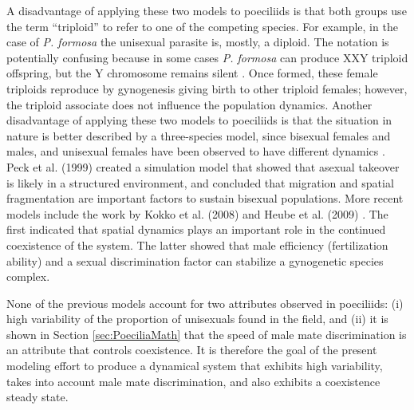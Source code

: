 	A disadvantage of applying these two models to poeciliids is that both groups use the term ``triploid'' to refer to one of the competing species. For example, in the case of \textit{P. formosa} the unisexual parasite is, mostly, a diploid. The notation is potentially confusing because in some cases \textit{P. formosa} can produce XXY triploid offspring, but the Y chromosome remains silent \cite{Balsano:Poecilia}. Once formed, these female triploids reproduce by gynogenesis giving birth to other triploid females; however, the triploid associate does not influence the population dynamics.  Another disadvantage of applying these two models to poeciliids is that the situation in nature is better described by a three-species model, since bisexual females and males, and unisexual females have been observed to have different dynamics \cite{Balsano:Poecilia}. Peck et al. (1999) \cite{Peck:maintenance} created a simulation model that showed that asexual takeover is likely in a structured environment, and concluded that migration and spatial fragmentation are important factors to sustain bisexual populations. More recent models include the work by Kokko et al. (2008) \cite{Kokko:persist} and Heube et al. (2009) \cite{Heubel:extinct}. The first indicated that spatial dynamics plays an important role in the continued coexistence of the system. The latter showed that male efficiency (fertilization ability) and a sexual discrimination factor can stabilize a gynogenetic species complex.
	
	None of the previous models account for two attributes observed in poeciliids: (i) high variability of the proportion of unisexuals found in the field, and (ii) it is shown in Section \ref{sec:PoeciliaMath} that the speed of male mate discrimination is an attribute that controls coexistence. It is therefore the goal of the present modeling effort to produce a dynamical system that exhibits high variability, takes into account male mate discrimination, and also exhibits a coexistence steady state. 

